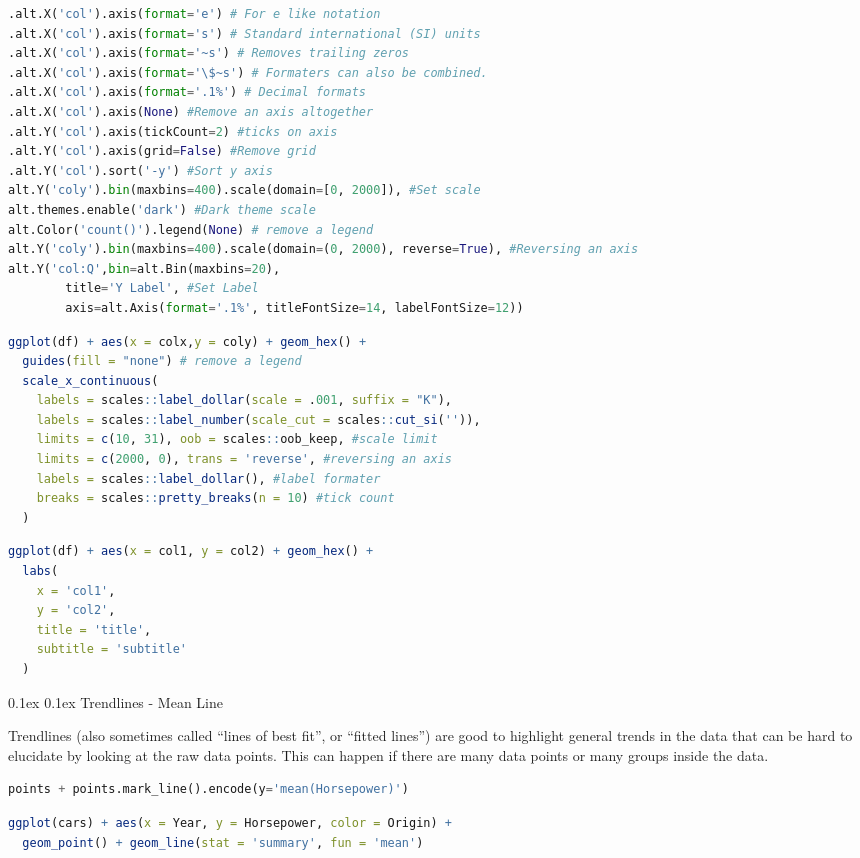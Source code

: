 \documentclass[8pt,landscape]{article}
\makeatletter
\renewcommand{\subsection}{\@startsection{subsection}{2}{0pt}%
    {0.1ex}%
    {0.1ex}%
    {\fontsize{8}{9}\bfseries\color{blue}}} %
\newcommand{\smalltext}[1]{%
  {\fontsize{8}{9}\selectfont\sloppy #1\par}%
}
\makeatother
\begin{document}
\begin{multicols}{3}
\begin{lstlisting}[language=Python]
.alt.X('col').axis(format='e') # For e like notation
.alt.X('col').axis(format='s') # Standard international (SI) units
.alt.X('col').axis(format='~s') # Removes trailing zeros
.alt.X('col').axis(format='\$~s') # Formaters can also be combined.
.alt.X('col').axis(format='.1%') # Decimal formats
.alt.X('col').axis(None) #Remove an axis altogether
.alt.Y('col').axis(tickCount=2) #ticks on axis
.alt.Y('col').axis(grid=False) #Remove grid
.alt.Y('col').sort('-y') #Sort y axis
alt.Y('coly').bin(maxbins=400).scale(domain=[0, 2000]), #Set scale
alt.themes.enable('dark') #Dark theme scale
alt.Color('count()').legend(None) # remove a legend 
alt.Y('coly').bin(maxbins=400).scale(domain=(0, 2000), reverse=True), #Reversing an axis
alt.Y('col:Q',bin=alt.Bin(maxbins=20),
        title='Y Label', #Set Label
        axis=alt.Axis(format='.1%', titleFontSize=14, labelFontSize=12))
\end{lstlisting}
\begin{lstlisting}[language=R]
ggplot(df) + aes(x = colx,y = coly) + geom_hex() +
  guides(fill = "none") # remove a legend 
  scale_x_continuous(
    labels = scales::label_dollar(scale = .001, suffix = "K"),
    labels = scales::label_number(scale_cut = scales::cut_si('')),
    limits = c(10, 31), oob = scales::oob_keep, #scale limit
    limits = c(2000, 0), trans = 'reverse', #reversing an axis
    labels = scales::label_dollar(), #label formater
    breaks = scales::pretty_breaks(n = 10) #tick count
  )
\end{lstlisting}
\begin{lstlisting}[language=R]
ggplot(df) + aes(x = col1, y = col2) + geom_hex() +
  labs(
    x = 'col1',
    y = 'col2',
    title = 'title',
    subtitle = 'subtitle'
  )
\end{lstlisting}

\subsection{Trendlines - Mean Line}
\smalltext{
Trendlines (also sometimes called “lines of best fit”, or “fitted lines”) are good to highlight general trends in the data that can be hard to elucidate by looking at the raw data points. This can happen if there are many data points or many groups inside the data.
}
\begin{lstlisting}[language=Python]
points + points.mark_line().encode(y='mean(Horsepower)')
\end{lstlisting}
\begin{lstlisting}[language=R]
ggplot(cars) + aes(x = Year, y = Horsepower, color = Origin) +
  geom_point() + geom_line(stat = 'summary', fun = 'mean')
\end{lstlisting}

\end{multicols}
\end{document}
